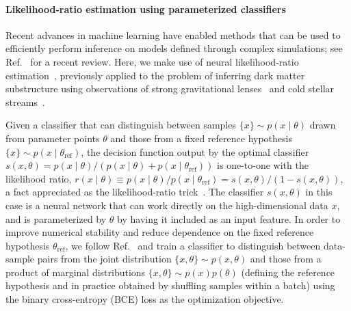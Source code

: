 \documentclass[preprint]{article}
\begin{document}
\paragraph{Likelihood-ratio estimation using parameterized classifiers} Recent advances in machine learning have enabled methods that can be used to efficiently perform inference on models defined through complex simulations; see Ref.~\cite{Cranmer:2019eaq} for a recent review. Here, we make use of neural likelihood-ratio estimation~\cite{Cranmer:2015bka,Baldi:2016fzo,Brehmer:2018eca,Brehmer:2018hga,Brehmer:2018kdj,Hermans:2019ioj}, previously applied to the problem of inferring dark matter substructure using observations of strong gravitational lenses~\cite{Brehmer:2019jyt} and cold stellar streams~\cite{Hermans:2020skz}. 

Given a classifier that can distinguish between samples $\{x\} \sim p(x\mid\theta)$ drawn from parameter points $\theta$ and those from a fixed reference hypothesis $\{x\} \sim p(x\mid\theta_\mathrm{ref})$, the decision function output by the optimal classifier $s(x, \theta) = {p(x\mid\theta)}/{\left(p(x\mid\theta) + p(x\mid\theta_\mathrm{ref})\right)}$ is one-to-one with the likelihood ratio, $r(x\mid \theta) \equiv {p(x\mid\theta)}/{p(x\mid\theta_\mathrm{ref})}  = {s(x, \theta)}/{\left(1 - s(x, \theta)\right)}$, a fact appreciated as the likelihood-ratio trick~\cite{Cranmer:2015bka,mohamed2017learning}. 
The classifier $s(x, \theta)$ in this case is a neural network that can work directly on the high-dimensional data $x$, and is parameterized by $\theta$ by having it included as an input feature. In order to improve numerical stability and reduce dependence on the fixed reference hypothesis $\theta_\mathrm{ref}$, we follow Ref.~\cite{Hermans:2019ioj} and train a classifier to distinguish between data-sample pairs from the joint distribution $\{x, \theta\} \sim p(x,\theta)$ and those from a product of marginal distributions $\{x, \theta\} \sim p(x)p(\theta)$ (defining the reference hypothesis and in practice obtained by shuffling samples within a batch) using the binary cross-entropy (BCE) loss as the optimization objective. 
\end{document}
